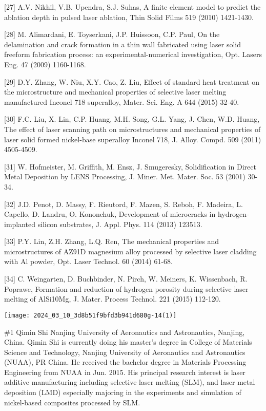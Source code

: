 \documentclass[10pt]{article}
\begin{document}
[27] A.V. Nikhil, V.B. Upendra, S.J. Suhas, A finite element model to predict the ablation depth in pulsed laser ablation, Thin Solid Films 519 (2010) 1421-1430.

[28] M. Alimardani, E. Toyserkani, J.P. Huissoon, C.P. Paul, On the delamination and crack formation in a thin wall fabricated using laser solid freeform fabrication process: an experimental-numerical investigation, Opt. Lasers Eng. 47 (2009) 1160-1168.

[29] D.Y. Zhang, W. Niu, X.Y. Cao, Z. Liu, Effect of standard heat treatment on the microstructure and mechanical properties of selective laser melting manufactured Inconel 718 superalloy, Mater. Sci. Eng. A 644 (2015) 32-40.

[30] F.C. Liu, X. Lin, C.P. Huang, M.H. Song, G.L. Yang, J. Chen, W.D. Huang, The effect of laser scanning path on microstructures and mechanical properties of laser solid formed nickel-base superalloy Inconel 718, J. Alloy. Compd. 509 (2011) 4505-4509.

[31] W. Hofmeister, M. Griffith, M. Ensz, J. Smugeresky, Solidification in Direct Metal Deposition by LENS Processing, J. Miner. Met. Mater. Soc. 53 (2001) 30-34.

[32] J.D. Penot, D. Massy, F. Rieutord, F. Mazen, S. Reboh, F. Madeira, L. Capello, D. Landru, O. Kononchuk, Development of microcracks in hydrogen-implanted silicon substrates, J. Appl. Phys. 114 (2013) 123513.

[33] P.Y. Lin, Z.H. Zhang, L.Q. Ren, The mechanical properties and microstructures of AZ91D magnesium alloy processed by selective laser cladding with $\mathrm{Al}$ powder, Opt. Laser Technol. 60 (2014) 61-68.

[34] C. Weingarten, D. Buchbinder, N. Pirch, W. Meiners, K. Wissenbach, R. Poprawe, Formation and reduction of hydrogen porosity during selective laser melting of AlSi10Mg, J. Mater. Process Technol. 221 (2015) 112-120.

\begin{center}
\texttt{[image: 2024\_03\_10\_3d8b51f9bfd3b941d680g-14(1)]}
\end{center}

\#1 Qimin Shi Nanjing University of Aeronautics and Astronautics, Nanjing, China. Qimin Shi is currently doing his master's degree in College of Materials Science and Technology, Nanjing University of Aeronautics and Astronautics (NUAA), PR China. He received the bachelor degree in Materials Processing Engineering from NUAA in Jun. 2015. His principal research interest is laser additive manufacturing including selective laser melting (SLM), and laser metal deposition (LMD) especially majoring in the experiments and simulation of nickel-based composites processed by SLM.
\end{document}
